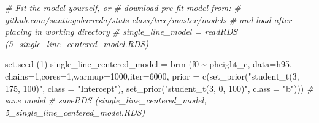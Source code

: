 \documentclass[
]{book}
\newenvironment{Shaded}{\begin{snugshade}}{\end{snugshade}}
\newcommand{\AttributeTok}[1]{\textcolor[rgb]{0.77,0.63,0.00}{#1}}
\newcommand{\CommentTok}[1]{\textcolor[rgb]{0.56,0.35,0.01}{\textit{#1}}}
\newcommand{\DecValTok}[1]{\textcolor[rgb]{0.00,0.00,0.81}{#1}}
\newcommand{\DocumentationTok}[1]{\textcolor[rgb]{0.56,0.35,0.01}{\textbf{\textit{#1}}}}
\newcommand{\FunctionTok}[1]{\textcolor[rgb]{0.00,0.00,0.00}{#1}}
\newcommand{\NormalTok}[1]{#1}
\newcommand{\OtherTok}[1]{\textcolor[rgb]{0.56,0.35,0.01}{#1}}
\newcommand{\SpecialCharTok}[1]{\textcolor[rgb]{0.00,0.00,0.00}{#1}}
\newcommand{\StringTok}[1]{\textcolor[rgb]{0.31,0.60,0.02}{#1}}
\begin{document}
\begin{Shaded}
\end{Shaded}

\begin{Shaded}
\begin{Highlighting}[]
\CommentTok{\# Fit the model yourself, or}
\CommentTok{\# download pre{-}fit model from: }
\CommentTok{\# github.com/santiagobarreda/stats{-}class/tree/master/models}
\CommentTok{\# and load after placing in working directory}
\CommentTok{\# single\_line\_model = readRDS (\textquotesingle{}5\_single\_line\_centered\_model.RDS\textquotesingle{})}

\FunctionTok{set.seed}\NormalTok{ (}\DecValTok{1}\NormalTok{)}
\NormalTok{single\_line\_centered\_model }\OtherTok{=}
  \FunctionTok{brm}\NormalTok{ (f0 }\SpecialCharTok{\textasciitilde{}}\NormalTok{ pheight\_c, }\AttributeTok{data=}\NormalTok{h95, }\AttributeTok{chains=}\DecValTok{1}\NormalTok{,}\AttributeTok{cores=}\DecValTok{1}\NormalTok{,}\AttributeTok{warmup=}\DecValTok{1000}\NormalTok{,}\AttributeTok{iter=}\DecValTok{6000}\NormalTok{,}
       \AttributeTok{prior =} \FunctionTok{c}\NormalTok{(}\FunctionTok{set\_prior}\NormalTok{(}\StringTok{"student\_t(3, 175, 100)"}\NormalTok{, }\AttributeTok{class =} \StringTok{"Intercept"}\NormalTok{),}
                 \FunctionTok{set\_prior}\NormalTok{(}\StringTok{"student\_t(3, 0, 100)"}\NormalTok{, }\AttributeTok{class =} \StringTok{"b"}\NormalTok{)))}
\CommentTok{\# save model}
\CommentTok{\# saveRDS (single\_line\_centered\_model, \textquotesingle{}5\_single\_line\_centered\_model.RDS\textquotesingle{})}
\end{Highlighting}
\end{Shaded}
\end{document}
